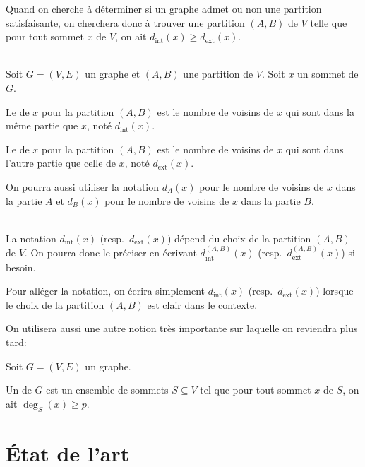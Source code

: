 Quand on cherche à déterminer si un graphe admet ou non une partition satisfaisante, on cherchera donc à trouver une partition \((A, B)\) de \(V\) telle que pour tout sommet \(x\) de \(V\), on ait \(d_{\mathrm{int}}(x) \geq d_{\mathrm{ext}}(x)\).

\begin{definition}\,\\
    Soit \(G = (V, E)\) un graphe et \((A, B)\) une partition de \(V\).
    Soit \(x\) un sommet de \(G\).

    Le  de \(x\) pour la partition \((A, B)\) est le nombre de voisins de \(x\) qui sont dans la même partie que \(x\), noté \(d_{\mathrm{int}}(x)\).

    Le  de \(x\) pour la partition \((A, B)\) est le nombre de voisins de \(x\) qui sont dans l'autre partie que celle de \(x\), noté \(d_{\mathrm{ext}}(x)\).
\end{definition}

On pourra aussi utiliser la notation \(d_A(x)\) pour le nombre de voisins de \(x\) dans la partie \(A\) et \(d_B(x)\) pour le nombre de voisins de \(x\) dans la partie \(B\).

\begin{remark}\,\\
    La notation \(d_{\mathrm{int}}(x)\) (resp.\ \(d_{\mathrm{ext}}(x)\)) dépend du choix de la partition \((A, B)\) de \(V\).
    On pourra donc le préciser en écrivant \(d_{\mathrm{int}}^{(A, B)}(x)\) (resp.\ \(d_{\mathrm{ext}}^{(A, B)}(x)\)) si besoin.

    Pour alléger la notation, on écrira simplement \(d_{\mathrm{int}}(x)\) (resp.\ \(d_{\mathrm{ext}}(x)\)) lorsque le choix de la partition \((A, B)\) est clair dans le contexte.
\end{remark}

On utilisera aussi une autre notion très importante sur laquelle on reviendra plus tard:

\begin{definition}
    Soit \(G = (V, E)\) un graphe.

    Un  de \(G\) est un ensemble de sommets \(S \subseteq V\) tel que pour tout sommet \(x\) de \(S\), on ait \(\deg_S(x) \geq p\).
\end{definition}


\section{État de l'art}\label{sec:s_3}

